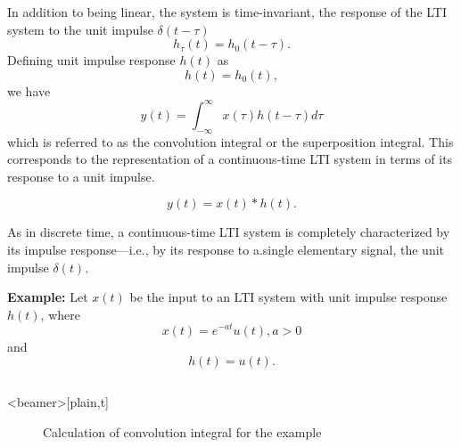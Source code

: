 \begin{frame}{}
        In addition to being linear, the system is time-invariant, the response of the LTI system to the unit impulse $\delta(t-\tau)$
        \begin{equation*}
            h_\tau(t) = h_0(t-\tau).
        \end{equation*}
        Defining unit impulse response $h(t)$ as
        \begin{equation*}
            h(t) = h_0(t),
        \end{equation*}
        we have
        \begin{equation*}
            \boxed{y(t) = \int_{-\infty}^{\infty} x(\tau)h(t - \tau)d\tau}
        \end{equation*}
        which is referred to as the \alert{convolution integral} or the \alert{superposition integral}. This  corresponds to the representation of a continuous-time LTI system in terms of its response to a unit impulse.

        \begin{equation*}
            y(t) = x(t) \ast h(t).
        \end{equation*}

        As in discrete time, a continuous-time LTI system is completely characterized by its impulse response---i.e., by its response to a.single elementary signal, the unit impulse $\delta(t)$.

\end{frame}



\begin{frame}{}
    \textbf{ Example: } Let $x(t)$ be the input to an LTI system with unit impulse response $h(t)$, where
    \begin{equation*}
        x(t) = e^{-at} u(t), a > 0
    \end{equation*}
    and
    \begin{equation*}
         h(t) = u(t).
    \end{equation*}


    {
        \begin{columns}
        \end{columns}
    }
\end{frame}


\begin{frame}<beamer>[plain,t]
    {
    \begin{figure}
      \centering
      
      \caption{Calculation of convolution integral for the example}\label{fi:ct_conv_example26}
    \end{figure}
    }
\end{frame}

